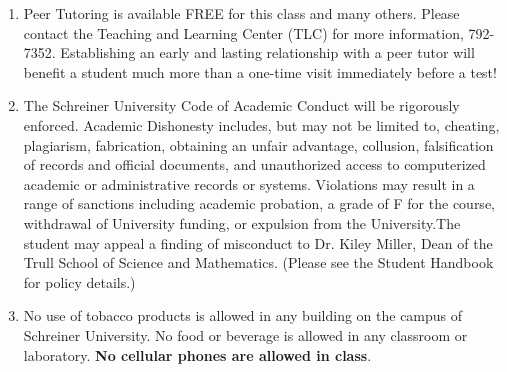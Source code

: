 \documentclass[11pt, a4paper]{article}
\begin{document}
\begin{enumerate}
\item Peer Tutoring is available FREE for this class and many others.  Please contact the Teaching and Learning Center (TLC) for more information, 792-7352.  Establishing an early and lasting relationship with a peer tutor will benefit a student much more than a one-time visit immediately before a test!

\item The Schreiner University Code of Academic Conduct will be rigorously enforced. Academic Dishonesty includes, but may not be limited to, cheating, plagiarism, fabrication, obtaining an unfair advantage, collusion, falsification of records and official documents, and unauthorized access to computerized academic or administrative records or systems. Violations may result in a range of sanctions including academic probation, a grade of F for the course, withdrawal of University funding, or expulsion from the University.The student may appeal a finding of misconduct to Dr. Kiley Miller, Dean of the Trull School of Science and Mathematics. (Please see the Student Handbook for policy details.)

\item No use of tobacco products is allowed in any building on the campus of Schreiner University.  No food or beverage is allowed in any classroom or laboratory. \textbf{No cellular phones are allowed in class}.
\end{enumerate}


\newpage
\end{document}
